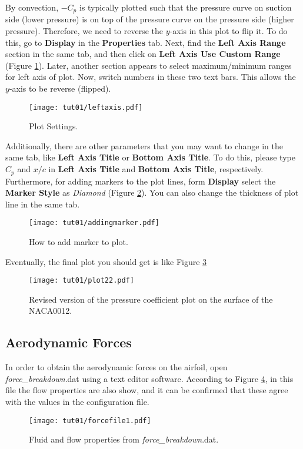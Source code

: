 By convection, $-C_p$ is typically plotted such that the pressure curve on suction side (lower pressure) is on top of the pressure curve on the pressure side (higher pressure). Therefore, we need to reverse the $y$-axis in this plot to flip it. To do this, go to \textbf{Display} in the \textbf{Properties} tab. Next, find the \textbf{Left Axis Range} section in the same tab, and then click on \textbf{Left Axis Use Custom Range} (Figure \ref{fig1:viewsetting}). Later, another section appears to select maximum/minimum ranges for left axis of plot. Now, switch numbers in these two text bars. This allows the $y$-axis to be reverse (flipped).
\begin{figure}[htbp]
    \centering
    \texttt{[image: tut01/leftaxis.pdf]}
    \caption{Plot Settings.}
    \label{fig1:viewsetting}
\end{figure}
Additionally, there are other parameters that you may want to change in the same tab, like \textbf{Left Axis Title} or \textbf{Bottom Axis Title}. To do this, please type $C_p$ and $x/c$ in \textbf{Left Axis Title} and \textbf{Bottom Axis Title}, respectively. Furthermore, for adding markers to the plot lines, form \textbf{Display} select the \textbf{Marker Style} as \textit{Diamond} (Figure \ref{fig1:marker}). You can also change the thickness of plot line in the same tab.
\begin{figure}[htbp]
    \centering
    \texttt{[image: tut01/addingmarker.pdf]}
    \caption{How to add marker to plot.}
    \label{fig1:marker}
\end{figure}
Eventually, the final plot you should get is like Figure \ref{fig1:surface_pressure2}
\begin{figure}[htbp]
    \centering
    \texttt{[image: tut01/plot22.pdf]}
    \caption{Revised version of the pressure coefficient plot on the surface of the NACA0012.}
    \label{fig1:surface_pressure2}
\end{figure}
\subsection{Aerodynamic Forces}
In order to obtain the aerodynamic forces on the airfoil, open \textit{force\_breakdown}.dat using a text editor software. According to Figure \ref{fig1:forcefile1}, in this file the flow properties are also show, and it can be confirmed that these agree with the values in the configuration file. 
\begin{figure}[htbp]
    \centering
    \texttt{[image: tut01/forcefile1.pdf]}
    \caption{Fluid and flow properties from \textit{force\_breakdown}.dat.}
    \label{fig1:forcefile1}
\end{figure}

